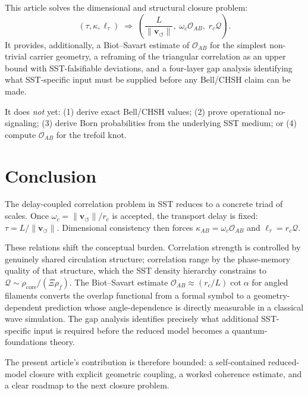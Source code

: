 \documentclass[11pt]{article}
\newcommand{\vnorm}{\lVert \mathbf{v}_{\!\boldsymbol{\circlearrowleft}}\rVert}
\newcommand{\rhoF}{\rho_{\!f}}
\newcommand{\rc}{r_c}
\newcommand{\rhocore}{\rho_{\text{core}}}
\begin{document}
This article solves the dimensional and structural closure problem:
\[
    (\tau, \kappa, \ell_\tau) \;\Rightarrow\; \left(\frac{L}{\vnorm},\; \omega_c\mathcal{O}_{AB},\; \rc\mathcal{Q}\right).
\]
It provides, additionally, a Biot--Savart estimate of $\mathcal{O}_{AB}$ for the simplest non-trivial carrier geometry, a reframing of the triangular correlation as an upper bound with SST-falsifiable deviations, and a four-layer gap analysis identifying what SST-specific input must be supplied before any Bell/CHSH claim can be made.

It does \emph{not} yet: (1) derive exact Bell/CHSH values; (2) prove operational no-signaling; (3) derive Born probabilities from the underlying SST medium; or (4) compute $\mathcal{O}_{AB}$ for the trefoil knot.

\section{Conclusion}

The delay-coupled correlation problem in SST reduces to a concrete triad of scales. Once $\omega_c = \vnorm/\rc$ is accepted, the transport delay is fixed: $\tau = L/\vnorm$. Dimensional consistency then forces $\kappa_{AB} = \omega_c\mathcal{O}_{AB}$ and $\ell_\tau = \rc\mathcal{Q}$.

These relations shift the conceptual burden. Correlation strength is controlled by genuinely shared circulation structure; correlation range by the phase-memory quality of that structure, which the SST density hierarchy constrains to $\mathcal{Q} \sim \rhocore/(\Xi\rhoF)$. The Biot--Savart estimate $\mathcal{O}_{AB} \approx (r_c/L)\cot\alpha$ for angled filaments converts the overlap functional from a formal symbol to a geometry-dependent prediction whose angle-dependence is directly measurable in a classical wave simulation. The gap analysis identifies precisely what additional SST-specific input is required before the reduced model becomes a quantum-foundations theory.

The present article's contribution is therefore bounded: a self-contained reduced-model closure with explicit geometric coupling, a worked coherence estimate, and a clear roadmap to the next closure problem.
\end{document}
